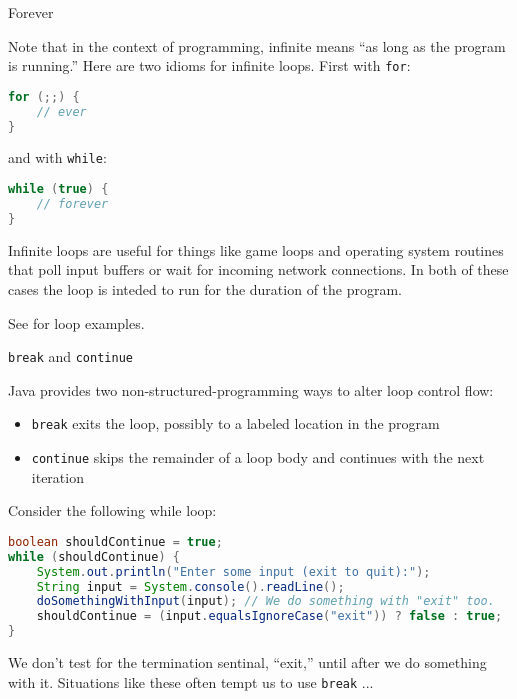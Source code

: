 \documentclass{beamer}
\begin{document}
\begin{frame}[fragile]{Forever}

Note that in the context of programming, infinite means ``as long as the program is running.''
Here are two idioms for infinite loops.  First with {\tt for}:
\begin{lstlisting}[language=Java]
for (;;) {
    // ever
}
\end{lstlisting}

and with {\tt while}:
\begin{lstlisting}[language=Java]
while (true) {
    // forever
}
\end{lstlisting}

Infinite loops are useful for things like game loops and operating system routines that poll input buffers or wait for incoming network connections.  In both of these cases the loop is inteded to run for the duration of the program.

See  for loop examples.

\end{frame}


\begin{frame}[fragile]{{\tt break} and {\tt continue}}


Java provides two non-structured-programming ways to alter loop control flow:
\begin{itemize}
\item {\tt break} exits the loop, possibly to a labeled location in the program
\item {\tt continue} skips the remainder of a loop body and continues with the next iteration
\end{itemize}

Consider the following while loop:
\begin{lstlisting}[language=Java]
boolean shouldContinue = true;
while (shouldContinue) {
    System.out.println("Enter some input (exit to quit):");
    String input = System.console().readLine();
    doSomethingWithInput(input); // We do something with "exit" too.
    shouldContinue = (input.equalsIgnoreCase("exit")) ? false : true;
}
\end{lstlisting}
We don't test for the termination sentinal, ``exit,'' until after we do something with it.  Situations like these often tempt us to use {\tt break} ...

\end{frame}
\end{document}

